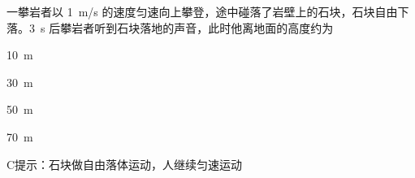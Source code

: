 一攀岩者以 \qty{1}{m/s} 的速度匀速向上攀登，途中碰落了岩壁上的石块，石块自由下落。\qty{3}{s} 后攀岩者听到石块落地的声音，此时他离地面的高度约为\paren[C]
\begin{choices}
    \item \qty{10}{m}
    \item \qty{30}{m}
    \item \qty{50}{m}
    \item \qty{70}{m}
\end{choices}
\begin{answer}
    C\qquad 提示：石块做自由落体运动，人继续匀速运动
\end{answer}